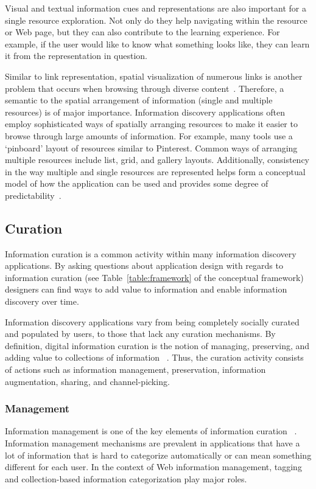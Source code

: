 \documentclass{sigchi}
\newcommand{\feature}[1]{{\ttfamily#1}}
\begin{document}
{{\feature{Visual} and \feature{textual} information cues and representations are also important for a single resource exploration. Not only do they help navigating within the resource or Web page, but they can also contribute to the learning experience. For example, if the user would like to know what something looks like, they can learn it from the representation in question.  

Similar to link representation, spatial visualization of numerous links is another problem that occurs when browsing through diverse content~\cite{abrams1998information}. Therefore, a semantic to the \feature{spatial arrangement} of information (single and multiple resources) is of major importance. Information discovery applications often employ sophisticated ways of spatially arranging resources to make it easier to browse through large amounts of information. For example, many tools use a `pinboard' layout of resources similar to Pinterest. Common ways of arranging multiple resources include list, grid, and gallery layouts. Additionally, \feature{consistency} in the way multiple and single resources are represented helps form a conceptual model of how the application can be used and provides some degree of predictability~\cite{norman2002design}.
} %

{\subsection{Curation}
Information curation is a common activity within many information discovery applications. By asking questions about application design with regards to information curation (see Table~\ref{table:framework} of the conceptual framework) designers can find ways to add value to information and enable information discovery over time.

Information discovery applications vary from being completely socially curated and populated by users, to those that lack any curation mechanisms. 
By definition, digital information curation is the notion of managing, preserving, and adding value to collections of information ~\cite{beagrie2008digital,whittaker2011personal}. Thus, the curation activity consists of actions such as information management, preservation, information augmentation, sharing, and channel-picking.

{\subsubsection{Management}
Information management is one of the key elements of information curation ~\cite{beagrie2008digital,whittaker2011personal}. Information management mechanisms are prevalent in applications that have a lot of information that is hard to categorize automatically or can mean something different for each user. In the context of Web information management, \feature{tagging} and \feature{collection-based} information categorization play major roles.

}}}
\end{document}

